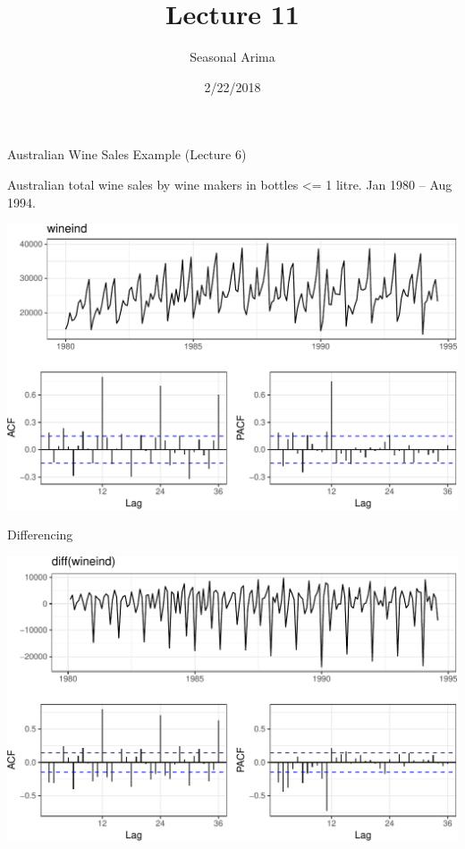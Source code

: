 \documentclass[11pt,ignorenonframetext,]{beamer}
\title{Lecture 11}
\subtitle{Seasonal Arima}
\date{2/22/2018}
\begin{document}
\frame{\titlepage}

\begin{frame}{%
\protect\hypertarget{australian-wine-sales-example-lecture-6}{%
Australian Wine Sales Example (Lecture 6)}}

Australian total wine sales by wine makers in bottles \textless{}= 1
litre. Jan 1980 – Aug 1994.

\begin{center}\includegraphics[width=\textwidth]{Lec11_files/figure-beamer/unnamed-chunk-1-1} \end{center}

\end{frame}

\begin{frame}{%
\protect\hypertarget{differencing}{%
Differencing}}

\begin{center}\includegraphics[width=\textwidth]{Lec11_files/figure-beamer/unnamed-chunk-2-1} \end{center}

\end{frame}
\end{document}

